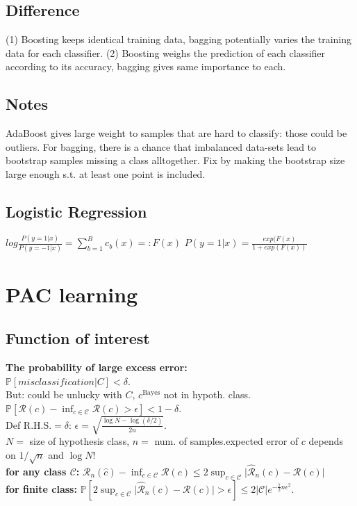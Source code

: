 \subsection*{Difference}
(1) Boosting keeps identical training data, bagging potentially varies the training data for each classifier. (2) Boosting weighs the prediction of each classifier according to its accuracy, bagging gives same importance to each.

\subsection*{Notes}
AdaBoost gives large weight to samples that are hard to classify: those could be outliers. For bagging, there is a chance that imbalanced data-sets lead to bootstrap samples missing a class alltogether. Fix by making the bootstrap size large enough s.t. at least one point is included.
\subsection*{Logistic Regression}
$log\frac{P(y=1|x)}{P(y=-1|x)} = \sum_{b=1}^Bc_b(x) =: F(x)$
$P(y=1|x) = \frac{exp(F(x)}{1+exp(F(x))}$

\section*{PAC learning}
\subsection*{Function of interest}
\textbf{The probability of large excess error:}\\
$\mathbb{P}[misclassification|C]< \delta$.\\
But: could be unlucky with $C$, $c^\text{Bayes}$ not in hypoth. class. \\
$\mathbb{P}[\mathcal{R}(\hat{c})-\inf_{c\in\mathcal{C}}\mathcal{R}(c)>\epsilon]<1-\delta$.\\
Def R.H.S.$=\delta$: $\epsilon=\sqrt{\frac{\log N - \log(\delta/2)}{2n}}$. \\
$N =$ size of hypothesis class, $n =$ num. of samples.expected error of $c$ depends on $1/\sqrt{n}$ and $\log N$!\\
\textbf{for any class $\mathcal{C}$:} $\mathcal{R}_n(\hat{c})-\inf_{c\in\mathcal{C}}\mathcal{R}(c) \leq 2\sup_{c\in\mathcal{C}}\lvert \hat{\mathcal{R}}_n(c) - \mathcal{R}(c) \rvert$ \\
\textbf{for finite class:}
$\mathbb{P}[2\sup_{c\in\mathcal{C}}\lvert \hat{\mathcal{R}}_n(c) - \mathcal{R}(c) \rvert>\epsilon]\leq 2\lvert\mathcal{C}\rvert e^{-\frac{1}{2}n\epsilon^2}$.
